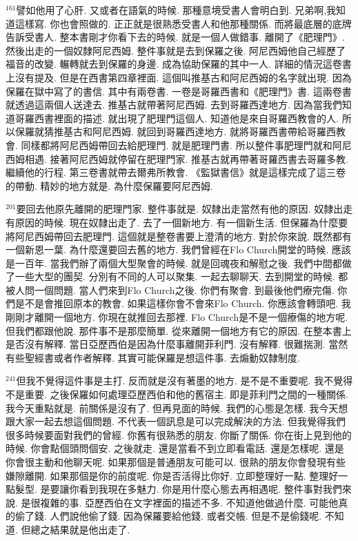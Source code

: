 \documentclass{book}
\begin{document}
$^{161}$譬如他用了心肝.
又或者在語氣的時候.
那種意境受書人會明白到.
兄弟啊,我知道這樣寫.
你也會照做的.
正正就是很熟悉受書人和他那種關係.
而將最底層的底牌告訴受書人.
整本書剛才你看下去的時候.
就是一個人做錯事.
離開了《肥理門》.
然後出走的一個奴隸阿尼西姆.
整件事就是去到保羅之後.
阿尼西姆他自己經歷了福音的改變.
輾轉就去到保羅的身邊.
成為協助保羅的其中一人.
詳細的情況這卷書上沒有提及.
但是在西書第四章裡面.
這個叫推基古和阿尼西姆的名字就出現.
因為保羅在獄中寫了的書信.
其中有兩卷書.
一卷是哥羅西書和《肥理門》書.
這兩卷書就透過這兩個人送達去.
推基古就帶著阿尼西姆.
去到哥羅西達地方.
因為當我們知道哥羅西書裡面的描述.
就出現了肥理門這個人.
知道他是來自哥羅西教會的人.
所以保羅就猜推基古和阿尼西姆.
就回到哥羅西達地方.
就將哥羅西書帶給哥羅西教會.
同樣都將阿尼西姆帶回去給肥理門.
就是肥理門書.
所以整件事肥理門就和阿尼西姆相遇.
接著阿尼西姆就停留在肥理門家.
推基古就再帶著哥羅西書去哥羅多教.
繼續他的行程.
第三卷書就帶去爾弗所教會.
《監獄書信》就是這樣完成了這三卷的帶動.
精妙的地方就是.
為什麼保羅要阿尼西姆.

$^{201}$要回去他原先離開的肥理門家.
整件事就是.
奴隸出走當然有他的原因.
奴隸出走有原因的時候.
現在奴隸出走了.
去了一個新地方.
有一個新生活.
但保羅為什麼要將阿尼西姆帶回去肥理門.
這個就是整卷書要上澄清的地方.
對於你來說.
既然都有一個新恩一葉.
為什麼還要回去舊的地方.
我們曾經在Flo Church開堂的時候.
應該是一百年.
當我們辦了兩個大型聚會的時候.
就是回魂夜和解慰之後.
我們中間都做了一些大型的團契.
分別有不同的人可以聚集.
一起去聊聊天.
去到開堂的時候.
都被人問一個問題.
當人們來到Flo Church之後.
你們有聚會.
到最後他們療完傷.
你們是不是會推回原本的教會.
如果這樣你會不會來Flo Church.
你應該會轉頭吧.
我剛剛才離開一個地方.
你現在就推回去那裡.
Flo Church是不是一個療傷的地方呢.
但我們都跟他說.
那件事不是那麼簡單.
從來離開一個地方有它的原因.
在整本書上是否沒有解釋.
當日亞歷西伯是因為什麼事離開菲利門.
沒有解釋.
很難揣測.
當然有些聖經書或者作者解釋.
其實可能保羅是想這件事.
去煽動奴隸制度.

$^{241}$但我不覺得這件事是主打.
反而就是沒有著墨的地方.
是不是不重要呢.
我不覺得不是重要.
之後保羅如何處理亞歷西伯和他的舊宿主.
即是菲利門之間的一種關係.
我今天重點就是.
前關係是沒有了.
但再見面的時候.
我們的心態是怎樣.
我今天想跟大家一起去想這個問題.
不代表一個訊息是可以完成解決的方法.
但我覺得我們很多時候要面對我們的曾經.
你舊有很熟悉的朋友.
你斷了關係.
你在街上見到他的時候.
你會點個頭問個安.
之後就走.
還是當看不到立即看電話.
還是怎樣呢.
還是你會很主動和他聊天呢.
如果那個是普通朋友可能可以.
很熟的朋友你會發現有些嫌隙離開.
如果那個是你的前度呢.
你是否活得比你好.
立即整理好一點.
整理好一點髮型.
是要讓你看到我現在多魅力.
你是用什麼心態去再相遇呢.
整件事對我們來說.
是很複雜的事.
亞歷西伯在文字裡面的描述不多.
不知道他做過什麼.
可能他真的偷了錢.
人們說他偷了錢.
因為保羅要給他錢.
或者交帳.
但是不是偷錢呢.
不知道.
但總之結果就是他出走了.
\end{document}
